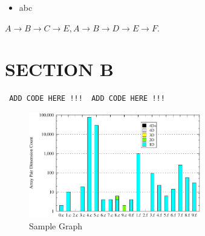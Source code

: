 \documentclass[6pt,twocolumn]{article}
\begin{document}
\begin{itemize}
\renewcommand{\labelitemi}{$\bullet$}
\item abc
\end{itemize}

$A \rightarrow B \rightarrow C \rightarrow E,  A \rightarrow B \rightarrow D \rightarrow E \rightarrow F$.

\section{\fontsize{8}{4}\selectfont SECTION B}

\begin{tiny} \begin{verbatim}
 ADD CODE HERE !!!  ADD CODE HERE !!!
\end{verbatim} \end{tiny}

\begin{figure}
\includegraphics[width=75mm]{sample}
\caption{Sample Graph}
\end{figure}


\nocite{*}



\end{document}
